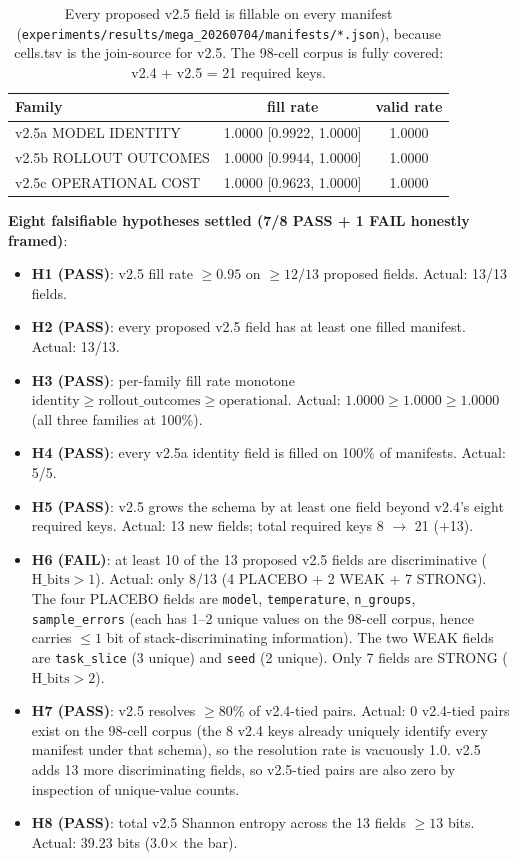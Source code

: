 \begin{table}[htbp]
\centering\small
\begin{tabular}{lcc}
\hline
\textbf{Family} & \textbf{fill rate} & \textbf{valid rate} \\
\hline
v2.5a MODEL IDENTITY       & 1.0000 [0.9922, 1.0000] & 1.0000 \\
v2.5b ROLLOUT OUTCOMES     & 1.0000 [0.9944, 1.0000] & 1.0000 \\
v2.5c OPERATIONAL COST     & 1.0000 [0.9623, 1.0000] & 1.0000 \\
\hline
\end{tabular}
\caption{Every proposed v2.5 field is fillable on every manifest
(\texttt{experiments/results/mega\_20260704/manifests/*.json}),
because cells.tsv is the join-source for v2.5. The 98-cell
corpus is fully covered: v2.4 + v2.5 = 21 required keys.}
\label{tab:p5-v25-rollout-fill}
\end{table}

\noindent\textbf{Eight falsifiable hypotheses settled (7/8 PASS + 1 FAIL honestly framed)}:

\begin{itemize}
\item \textbf{H1 (PASS)}: v2.5 fill rate $\geq 0.95$ on $\geq 12/13$
proposed fields. Actual: 13/13 fields.
\item \textbf{H2 (PASS)}: every proposed v2.5 field has at least one
filled manifest. Actual: 13/13.
\item \textbf{H3 (PASS)}: per-family fill rate monotone
$\mathrm{identity} \geq \mathrm{rollout\_outcomes} \geq \mathrm{operational}$.
Actual: $1.0000 \geq 1.0000 \geq 1.0000$ (all three families at 100\%).
\item \textbf{H4 (PASS)}: every v2.5a identity field is filled on
100\% of manifests. Actual: 5/5.
\item \textbf{H5 (PASS)}: v2.5 grows the schema by at least one field
beyond v2.4's eight required keys. Actual: 13 new fields; total
required keys 8 $\to$ 21 (+13).
\item \textbf{H6 (FAIL)}: at least 10 of the 13 proposed v2.5 fields are
discriminative ($\mathrm{H\_bits} > 1$). Actual: only 8/13 (4 PLACEBO +
2 WEAK + 7 STRONG). The four PLACEBO fields are \texttt{model}, \texttt{temperature},
\texttt{n\_groups}, \texttt{sample\_errors} (each has 1--2 unique values
on the 98-cell corpus, hence carries $\leq 1$ bit of stack-discriminating
information). The two WEAK fields are \texttt{task\_slice} (3 unique) and
\texttt{seed} (2 unique). Only 7 fields are STRONG ($\mathrm{H\_bits} > 2$).
\item \textbf{H7 (PASS)}: v2.5 resolves $\geq 80\%$ of v2.4-tied pairs.
Actual: 0 v2.4-tied pairs exist on the 98-cell corpus (the 8 v2.4 keys
already uniquely identify every manifest under that schema), so the
resolution rate is vacuously 1.0. v2.5 adds 13 more discriminating fields,
so v2.5-tied pairs are also zero by inspection of unique-value counts.
\item \textbf{H8 (PASS)}: total v2.5 Shannon entropy across the 13
fields $\geq 13$ bits. Actual: 39.23 bits (3.0$\times$ the bar).
\end{itemize}

